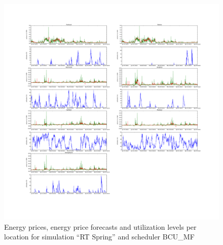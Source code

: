 \begin{figure}[htbp]
	\centering
	\vspace*{-0.6in}
	\hspace*{-1.9in}
		\includegraphics[width=1.60\textwidth]{figures/appendix_simulation_results/RT_Spring_scenario_6.pdf}
	\vspace*{-1.0in}
	\caption{Energy prices, energy price forecasts and utilization levels per location for simulation ``RT Spring'' and scheduler BCU\_MF}
	\label{fig:app_RT_Spring_scenario_6}
\end{figure}

